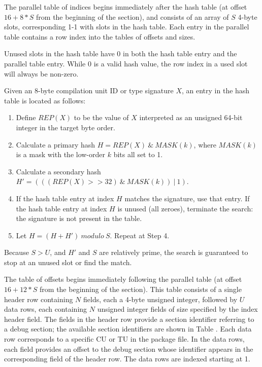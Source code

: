 The parallel table of indices begins immediately after the hash table 
(at offset \mbox{$16 + 8 * S$} from the beginning of the section), and
consists of an array of $S$ 4-byte slots,
corresponding 1-1 with slots in the hash
table. Each entry in the parallel table contains a row index into
the tables of offsets and sizes.

Unused slots in the hash table have 0 in both the hash table
entry and the parallel table entry. While 0 is a valid hash
value, the row index in a used slot will always be non-zero.

Given an 8-byte compilation unit ID or type signature $X$,
an entry in the hash table is located as follows:
\begin{enumerate}[1. ]
\item Define $REP(X)$ to be the value of $X$ interpreted as an 
      unsigned 64-bit integer in the target byte order.
\item Calculate a primary hash $H = REP(X)\ \&\ MASK(k)$, where
      $MASK(k)$ is a mask with the low-order $k$ bits all set to 1.
\item Calculate a secondary hash $H' = (((REP(X)>>32)\ \&\ MASK(k))\ |\ 1)$.
\item If the hash table entry at index $H$ matches the signature, use
      that entry. If the hash table entry at index $H$ is unused (all
      zeroes), terminate the search: the signature is not present
      in the table.
\item Let $H = (H + H')\ modulo\ S$. Repeat at Step 4.
\end{enumerate}

Because $S > U$, and $H'$ and $S$ are relatively prime, the search is
guaranteed to stop at an unused slot or find the match.

The table of offsets begins immediately following the parallel
table (at offset \mbox{$16 + 12 * S$} from the beginning of the section).
This table consists of a single header row containing $N$ fields,
each a 4-byte unsigned integer, followed by $U$ data rows, each
\bb
containing $N$ unsigned integer fields of size specified 
by the index header \HFNoffsetsizeflag{} field. 
\eb
The fields in the header row provide a section identifier referring 
to a debug section; the available section identifiers are shown in
Table . 
Each data row corresponds to a specific CU
or TU in the package file. In the data rows, each field provides
an offset to the debug section whose identifier appears in the
corresponding field of the header row. The data rows are indexed
starting at 1.


